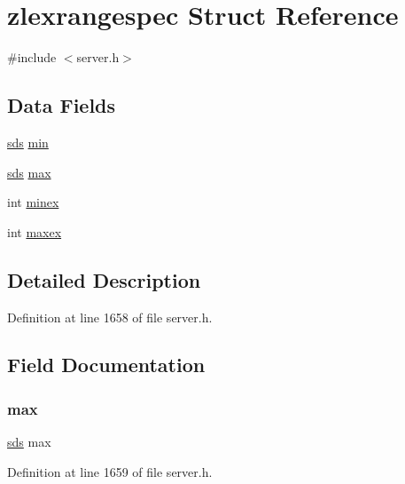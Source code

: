 \hypertarget{structzlexrangespec}{}\section{zlexrangespec Struct Reference}
\label{structzlexrangespec}


{\ttfamily \#include $<$server.\+h$>$}

\subsection*{Data Fields}
\begin{DoxyCompactItemize}
\item 
\hyperlink{sds_8h_ad69abac3df4532879db9642c95f5ef6f}{sds} \hyperlink{structzlexrangespec_aad18fc6b5dc17b81b9d0a7048634886f}{min}
\item 
\hyperlink{sds_8h_ad69abac3df4532879db9642c95f5ef6f}{sds} \hyperlink{structzlexrangespec_a3ea076c37e5c848de0c002c1137ec76a}{max}
\item 
int \hyperlink{structzlexrangespec_a8e30ae1b8a7b7c514cb8bf62df65f4eb}{minex}
\item 
int \hyperlink{structzlexrangespec_a3d965e52da103eda2e33d871b0658cf3}{maxex}
\end{DoxyCompactItemize}


\subsection{Detailed Description}


Definition at line 1658 of file server.\+h.



\subsection{Field Documentation}
\mbox{\label{structzlexrangespec_a3ea076c37e5c848de0c002c1137ec76a}} 
\subsubsection{\texorpdfstring{max}{max}}
{\footnotesize\ttfamily \hyperlink{sds_8h_ad69abac3df4532879db9642c95f5ef6f}{sds} max}



Definition at line 1659 of file server.\+h.

